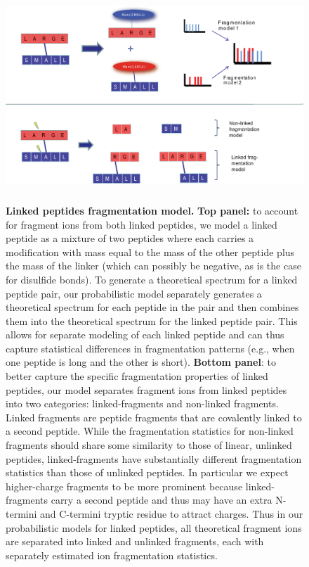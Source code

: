 \documentclass[arial,11pt]{article}
\begin{document}
\begin{figure}[h!]
	\centering
		\includegraphics[height=80mm, width=160mm]{figures/Disulfide_fragment_model.eps}
		\caption{\footnotesize{\bf Linked peptides fragmentation model.} { {\bf Top panel:} to account for fragment ions from both linked peptides, we model a linked peptide as a mixture of two peptides where each carries a modification with mass equal to the mass of the other peptide plus the mass of the linker (which can possibly be negative, as is the case for disulfide bonds). To generate a theoretical spectrum for a linked peptide pair, our probabilistic model separately generates a theoretical spectrum for each peptide in the pair and then combines them into the theoretical spectrum for the linked peptide pair. This allows for separate modeling of each linked peptide and can thus capture statistical differences in fragmentation patterns (e.g., when one peptide is long and the other is short). {\bf Bottom panel}: to better capture the specific fragmentation properties of linked peptides, our model separates fragment ions from linked peptides into two categories: linked-fragments and non-linked fragments. Linked fragments are peptide fragments that are covalently linked to a second peptide.  While the fragmentation statistics for non-linked fragments should share some similarity to those of linear, unlinked peptides, linked-fragments have substantially different fragmentation statistics than those of unlinked peptides. In particular we expect higher-charge fragments to be more prominent because linked-fragments carry a second peptide and thus may have an extra N-termini and C-termini tryptic residue to attract charges. Thus in our probabilistic models for linked peptides, all theoretical fragment ions are separated into linked and unlinked fragments, each with separately estimated ion fragmentation statistics.}}
\label{linkedmodel}
\end{figure}
\end{document}

